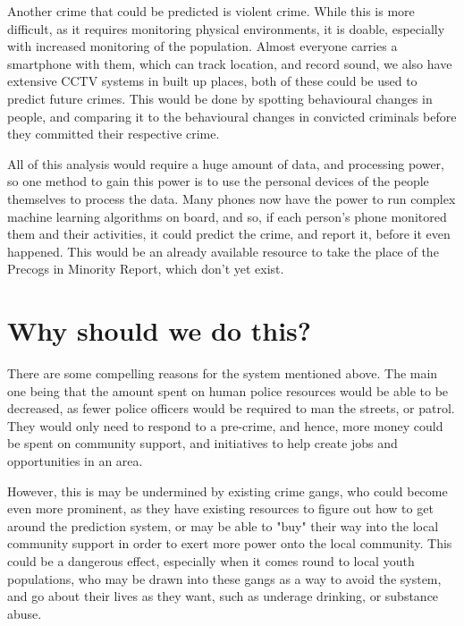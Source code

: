 \documentclass[12pt]{amsart}
\begin{document}
    Another crime that could be predicted is violent crime.
    While this is more difficult, as it requires monitoring physical environments, it is doable, especially with
    increased monitoring of the population.
    Almost everyone carries a smartphone with them, which can track location, and record sound, we also have extensive
    CCTV systems in built up places, both of these could be used to predict future crimes.
    This would be done by spotting behavioural changes in people, and comparing it to the behavioural changes in
    convicted criminals before they committed their respective crime.

    All of this analysis would require a huge amount of data, and processing power, so one method to gain this power
    is to use the personal devices of the people themselves to process the data.
    Many phones now have the power to run complex machine learning algorithms on board, and so, if each person's phone
    monitored them and their activities, it could predict the crime, and report it, before it even happened.
    This would be an already available resource to take the place of the Precogs in Minority Report, which don't yet
    exist.

    \section{Why should we do this?}\label{sec:why-should-we-do-this?}

    There are some compelling reasons for the system mentioned above.
    The main one being that the amount spent on human police resources would be able to be decreased, as fewer
    police officers would be required to man the streets, or patrol.
    They would only need to respond to a pre-crime, and hence, more money could be spent on community support, and
    initiatives to help create jobs and opportunities in an area.

    However, this is may be undermined by existing crime gangs, who could become even more prominent, as they have
    existing resources to figure out how to get around the prediction system, or may be able to "buy" their way into
    the local community support in order to exert more power onto the local community.
    This could be a dangerous effect, especially when it comes round to local youth populations, who may be drawn into
    these gangs as a way to avoid the system, and go about their lives as they want, such as underage drinking, or
    substance abuse.
\end{document}

